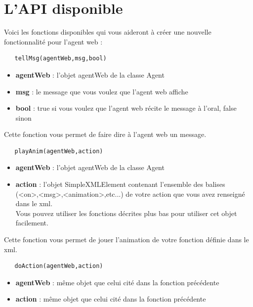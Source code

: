 \documentclass[11pt,dvipsnames,svgnames]{report}
\begin{document}
 \section{L'API disponible}
 
 	Voici les fonctions disponibles qui vous aideront à créer une nouvelle fonctionnalité pour l'agent web :
 	\bigskip
   \begin{lstlisting}
   tellMsg(agentWeb,msg,bool)
   \end{lstlisting}
   \begin{itemize}
   \item \textbf{agentWeb} : l'objet agentWeb de la classe Agent
   \item \textbf{msg} : le message que vous voulez que l'agent web affiche
   \item \textbf{bool} : true si vous voulez que l'agent web récite le message à l'oral, false sinon\\
   \end{itemize}
   Cette fonction vous permet de faire dire à l'agent web un message.\\
   \bigskip
   \begin{lstlisting}
   playAnim(agentWeb,action)
   \end{lstlisting}
   \begin{itemize}
   \item \textbf{agentWeb} : l'objet agentWeb de la classe Agent
   \item \textbf{action} : l'objet SimpleXMLElement contenant l'ensemble des balises\\
    (<on>,<msg>,<animation>,etc...) de votre action que vous avez renseigné dans le xml.\\ Vous pouvez utiliser les fonctions décrites plus bas pour utiliser cet objet facilement.\\
   \end{itemize}
   Cette fonction vous permet de jouer l'animation de votre fonction définie dans le xml.\\
   \bigskip
   \begin{lstlisting}
   doAction(agentWeb,action)
   \end{lstlisting}
   \begin{itemize}
   \item \textbf{agentWeb} : même objet que celui cité dans la fonction précédente
   \item \textbf{action} : même objet que celui cité dans la fonction précédente\\
   \end{itemize}
\end{document}
